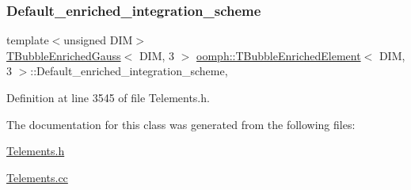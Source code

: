 \subsubsection{\texorpdfstring{Default\+\_\+enriched\+\_\+integration\+\_\+scheme}{Default\_enriched\_integration\_scheme}}
{\footnotesize\ttfamily template$<$unsigned D\+IM$>$ \\
\hyperlink{classoomph_1_1TBubbleEnrichedGauss}{T\+Bubble\+Enriched\+Gauss}$<$ D\+IM, 3 $>$ \hyperlink{classoomph_1_1TBubbleEnrichedElement}{oomph\+::\+T\+Bubble\+Enriched\+Element}$<$ D\+IM, 3 $>$\+::Default\+\_\+enriched\+\_\+integration\+\_\+scheme\hspace{0.3cm}{\ttfamily [static]}, {\ttfamily [private]}}



Definition at line 3545 of file Telements.\+h.



The documentation for this class was generated from the following files\+:\begin{DoxyCompactItemize}
\item 
\hyperlink{Telements_8h}{Telements.\+h}\item 
\hyperlink{Telements_8cc}{Telements.\+cc}\end{DoxyCompactItemize}

